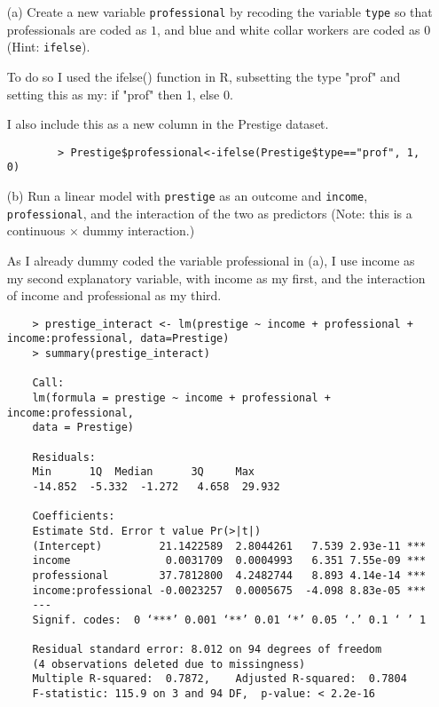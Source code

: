 \documentclass[12pt,letterpaper]{article}
\begin{document}
\newpage
\begin{enumerate}
	
	\item [(a)]
	Create a new variable \texttt{professional} by recoding the variable \texttt{type} so that professionals are coded as $1$, and blue and white collar workers are coded as $0$ (Hint: \texttt{ifelse}).
	
	To do so I used the ifelse() function in R, subsetting the type "prof" and setting this as my: if "prof" then 1, else 0. 
	
	I also include this as a new column in the Prestige dataset.
	
	\begin{verbatim}
		> Prestige$professional<-ifelse(Prestige$type=="prof", 1, 0)
\end{verbatim} 	
	
	
	\item [(b)]
	Run a linear model with \texttt{prestige} as an outcome and \texttt{income}, \texttt{professional}, and the interaction of the two as predictors (Note: this is a continuous $\times$ dummy interaction.)
	
	As I already dummy coded the variable professional in (a), I use income as my second explanatory variable, with income as my first, and the interaction of income and professional as my third. 
	
		\begin{verbatim}
	> prestige_interact <- lm(prestige ~ income + professional + income:professional, data=Prestige)
	> summary(prestige_interact)
	
	Call:
	lm(formula = prestige ~ income + professional + income:professional, 
	data = Prestige)
	
	Residuals:
	Min      1Q  Median      3Q     Max 
	-14.852  -5.332  -1.272   4.658  29.932 
	
	Coefficients:
	Estimate Std. Error t value Pr(>|t|)    
	(Intercept)         21.1422589  2.8044261   7.539 2.93e-11 ***
	income               0.0031709  0.0004993   6.351 7.55e-09 ***
	professional        37.7812800  4.2482744   8.893 4.14e-14 ***
	income:professional -0.0023257  0.0005675  -4.098 8.83e-05 ***
	---
	Signif. codes:  0 ‘***’ 0.001 ‘**’ 0.01 ‘*’ 0.05 ‘.’ 0.1 ‘ ’ 1
	
	Residual standard error: 8.012 on 94 degrees of freedom
	(4 observations deleted due to missingness)
	Multiple R-squared:  0.7872,	Adjusted R-squared:  0.7804 
	F-statistic: 115.9 on 3 and 94 DF,  p-value: < 2.2e-16
\end{verbatim} 	
	

\end{enumerate}
\end{document}
